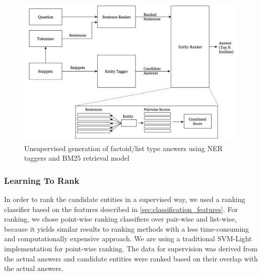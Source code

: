 \begin{figure}
    \centering
    \includegraphics[scale=0.4]{images/UnsupervisedNERPipeline.png}
    \caption{Unsupervised generation of factoid/list type answers using NER taggers and BM25 retrieval model}
    \label{fig:UnsupervisedNERPipeline}
\end{figure}

\subsubsection{Learning To Rank}

In order to rank the candidate entities in a supervised way, we used a ranking classifier based on the features described in \ref{sec:classification_features}. For ranking, we chose point-wise ranking classifiers over pair-wise and list-wise, because it yields similar results to ranking methods with a less time-consuming and computationally expensive approach. We are using a traditional SVM-Light \cite{svmlight} implementation for point-wise ranking. The data for supervision was derived from the actual answers and candidate entities were ranked based on their overlap with the actual answers. 



